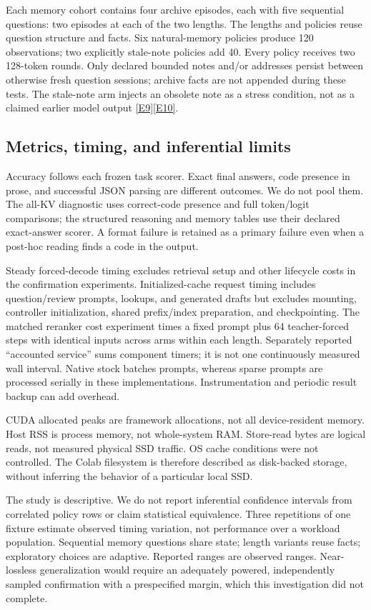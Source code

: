 \documentclass[11pt,letterpaper]{article}
\newcommand{\ev}[1]{\hyperref[app:evidence]{[E#1]}}
\begin{document}
Each memory cohort contains four archive episodes, each with five sequential questions: two episodes at each of the two lengths. The lengths and policies reuse question structure and facts. Six natural-memory policies produce 120 observations; two explicitly stale-note policies add 40. Every policy receives two 128-token rounds. Only declared bounded notes and/or addresses persist between otherwise fresh question sessions; archive facts are not appended during these tests. The stale-note arm injects an obsolete note as a stress condition, not as a claimed earlier model output \ev{9}\ev{10}.

\subsection{Metrics, timing, and inferential limits}
Accuracy follows each frozen task scorer. Exact final answers, code presence in prose, and successful JSON parsing are different outcomes. We do not pool them. The all-KV diagnostic uses correct-code presence and full token/logit comparisons; the structured reasoning and memory tables use their declared exact-answer scorer. A format failure is retained as a primary failure even when a post-hoc reading finds a code in the output.

Steady forced-decode timing excludes retrieval setup and other lifecycle costs in the confirmation experiments. Initialized-cache request timing includes question/review prompts, lookups, and generated drafts but excludes mounting, controller initialization, shared prefix/index preparation, and checkpointing. The matched reranker cost experiment times a fixed prompt plus 64 teacher-forced steps with identical inputs across arms within each length. Separately reported ``accounted service'' sums component timers; it is not one continuously measured wall interval. Native stock batches prompts, whereas sparse prompts are processed serially in these implementations. Instrumentation and periodic result backup can add overhead.

CUDA allocated peaks are framework allocations, not all device-resident memory. Host RSS is process memory, not whole-system RAM. Store-read bytes are logical reads, not measured physical SSD traffic. OS cache conditions were not controlled. The Colab filesystem is therefore described as disk-backed storage, without inferring the behavior of a particular local SSD.

The study is descriptive. We do not report inferential confidence intervals from correlated policy rows or claim statistical equivalence. Three repetitions of one fixture estimate observed timing variation, not performance over a workload population. Sequential memory questions share state; length variants reuse facts; exploratory choices are adaptive. Reported ranges are observed ranges. Near-lossless generalization would require an adequately powered, independently sampled confirmation with a prespecified margin, which this investigation did not complete.
\end{document}
